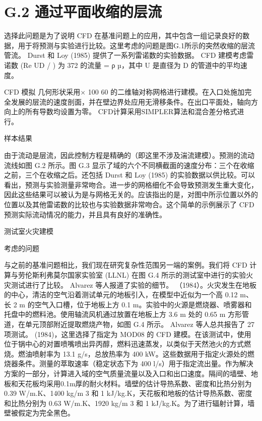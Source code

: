 \documentclass[11pt,a4paper,openany,fontset=none]{ctexbook}
\begin{document}
\section*{G.2 通过平面收缩的层流}

选择此问题是为了说明 CFD 在基准问题上的应用，其中包含一组记录良好的数据，用于将预测与实验进行比较。这里考虑的问题是图G.1所示的突然收缩的层流管流。 Durst 和 Loy (1985) 提供了一系列雷诺数的实验数据。 CFD 建模考虑雷诺数 (Re UD / ) 为 372 的流量 = ρ µ，其中 U 是直径为 D 的管道中的平均速度。

CFD 模拟
几何形状采用× 100 60 的二维轴对称网格进行建模。在入口处施加完全发展的层流的速度剖面，并在壁边界处应用无滑移条件。在出口平面处，轴向方向上的所有导数均设置为零。 CFD计算采用SIMPLER算法和混合差分格式进行。

样本结果

由于流动是层流，因此控制方程是精确的（即这里不涉及湍流建模）。预测的流动流线如图 G.2 所示。图 G.3 显示了域的六个不同横截面的速度分布：三个在收缩之前，三个在收缩之后。还包括 Durst 和 Loy (1985) 的实验数据以供比较。可以看出，预测与实验测量非常吻合。进一步的网格细化不会导致预测发生重大变化，因此这些结果可以被认为是与网格无关的。应该指出的是，对图中所示位置以外的位置以及其他雷诺数的比较也与实验数据非常吻合。这个简单的示例展示了 CFD 预测实际流动情况的能力，并且具有良好的准确性。

测试室火灾建模

考虑的问题

与之前的基准问题相比，我们现在研究复杂性范围另一端的案例。我们将 CFD 计算与劳伦斯利弗莫尔国家实验室 (LLNL) 在图 G.4 所示的测试室中进行的实验火灾测试进行了比较。 Alvarez 等人报道了实验的细节。 （1984）。火灾发生在地板的中心，清洁的空气沿着测试单元的地板引入，在模型中近似为一个高 0.12 m、长 2 m 的空气入口槽，位于地板上方 0.1 m。实验中的火源是燃烧器、喷雾器和托盘中的燃料池。使用轴流风机通过放置在地板上方 3.6 m 处的 0.65 m 方形管道，在单元顶部附近提取燃烧产物，如图 G.4 所示。 Alvarez 等人总共报告了 27 项测试。 (1984)，这里选择了指定为 MOD08 的 CFD 建模。在该测试中，使用位于锅中心的对置喷嘴喷出异丙醇，燃料迅速蒸发，以类似于天然池火的方式燃烧。燃油喷射率为 13.1 g/s，总放热率为 400 kW。这些数据用于指定火源处的燃烧器条件。测量的萃取速率（稳定状态下为 400 l/s）用于指定流出量。作为解决方案的一部分，计算进入域的空气质量流量以及入口和出口速度。隔间的墙壁、地板和天花板均采用0.1m厚的耐火材料。墙壁的估计导热系数、密度和比热分别为 0.39 W/m.K、1400 kg/m 3 和 1 kJ/kg.K，天花板和地板的估计导热系数、密度和比热分别为 0.63 W/m.K、1920 kg/m 3 和 1 kJ/kg.K。为了进行辐射计算，墙壁被假定为完全黑色。
\end{document}
